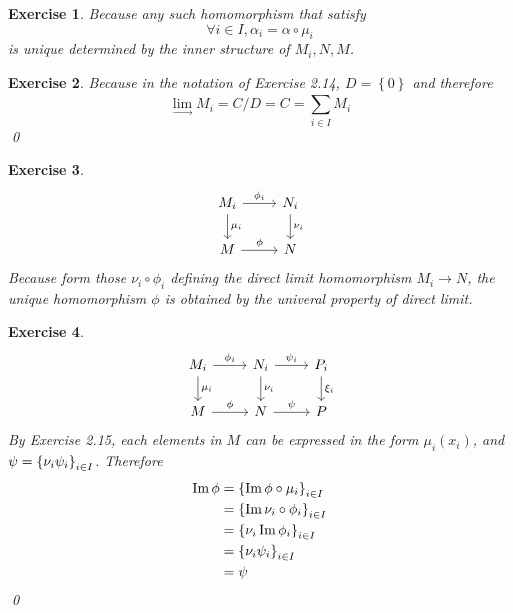 \documentclass{article}
\theoremstyle{breakstyle}
\newtheorem{exercise}{Exercise}
\let\ker\relax
\DeclareMathOperator{\ker}{Ker}
\DeclareMathOperator{\im}{Im}
\begin{document}
\begin{exercise}
    Because any such homomorphism that satisfy
    $$
    \forall i\in I,\alpha_{i}=\alpha\circ \mu_{i}
    $$
    is unique determined by the inner structure of $M_{i},N,M$.
\end{exercise}

\begin{exercise}
    Because in the notation of \emph{Exercise 2.14},
    $D=\left\{ 0 \right\} $ and therefore
    $$
    \lim_{\rightarrow }M_{i}=C / D=C=\sum_{i\in I}^{} M_{i} 
    $$
    \qed
\end{exercise}

\begin{exercise}
    $$
        \begin{tikzcd}
        M_i \arrow[r, "\phi_i"] \arrow[d, "\mu_i"] & N_i \arrow[d, "\nu_i"] \\
        M \arrow[r, "\phi"]                        & N                     
        \end{tikzcd}
    $$
    Because form those $\nu_{i}\circ \phi_{i}$ defining the direct limit homomorphism $M_{i}\longrightarrow N$,
    the unique homomorphism $\phi$ is obtained by the univeral property of direct limit.
\end{exercise}

\begin{exercise}
    $$
        \begin{tikzcd}
        M_i \arrow[r, "\phi_i"] \arrow[d, "\mu_i"] & N_i \arrow[d, "\nu_i"] \arrow[r, "\psi_i"] & P_i \arrow[d, "\xi_i"] \\
        M \arrow[r, "\phi"]                        & N \arrow[r, "\psi"]                        & P                     
        \end{tikzcd}
    $$
    By \emph{Exercise 2.15}, each elements in $M$ can be expressed in the form $\mu_{i}(x_{i})$,
    and $\ker{\psi}=\left\{ \nu_{i} \ker{\psi_{i}}\right\}_{i\in I} $.
    Therefore
    \begin{align*}
        \im{\phi}&= \left\{ \im{\phi\circ\mu_{i} } \right\}_{i\in I}  \\
                 &= \left\{ \im{\nu_{i}\circ \phi_{i}} \right\}_{i\in I}  \\
                 &= \left\{ \nu_{i}\im{\phi_{i}} \right\}_{i\in I}  \\
                 &= \left\{ \nu_{i}\ker{\psi_{i}} \right\}_{i\in I}  \\
                 &= \ker{\psi} \\
    \end{align*}
    \qed
\end{exercise}
\end{document}
